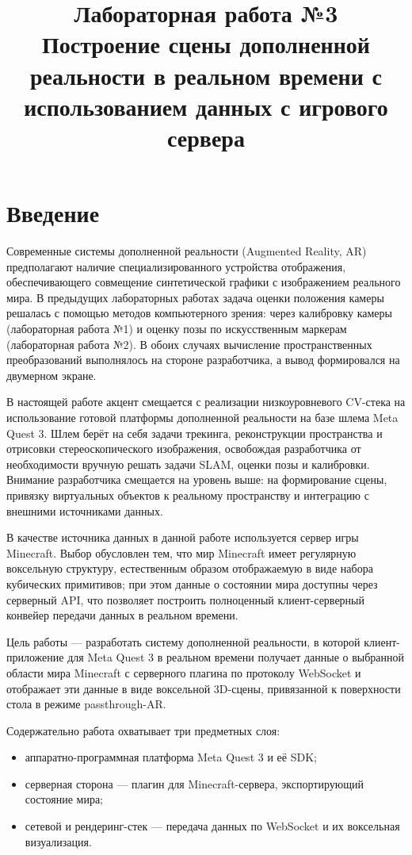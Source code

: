 \documentclass[a4paper,12pt]{article}
\title{Лабораторная работа №3 \\
Построение сцены дополненной реальности в реальном времени с использованием данных с игрового сервера}
\author{}
\date{}
\begin{document}
\maketitle


\section*{Введение}

Современные системы дополненной реальности (Augmented Reality, AR) предполагают наличие специализированного устройства отображения, обеспечивающего совмещение синтетической графики с изображением реального мира. В предыдущих лабораторных работах задача оценки положения камеры решалась с помощью методов компьютерного зрения: через калибровку камеры (лабораторная работа №1) и оценку позы по искусственным маркерам (лабораторная работа №2). В обоих случаях вычисление пространственных преобразований выполнялось на стороне разработчика, а вывод формировался на двумерном экране.

В настоящей работе акцент смещается с реализации низкоуровневого CV-стека на использование готовой платформы дополненной реальности на базе шлема Meta Quest 3. Шлем берёт на себя задачи трекинга, реконструкции пространства и отрисовки стереоскопического изображения, освобождая разработчика от необходимости вручную решать задачи SLAM, оценки позы и калибровки. Внимание разработчика смещается на уровень выше: на формирование сцены, привязку виртуальных объектов к реальному пространству и интеграцию с внешними источниками данных.

В качестве источника данных в данной работе используется сервер игры Minecraft. Выбор обусловлен тем, что мир Minecraft имеет регулярную воксельную структуру, естественным образом отображаемую в виде набора кубических примитивов; при этом данные о состоянии мира доступны через серверный API, что позволяет построить полноценный клиент-серверный конвейер передачи данных в реальном времени.

Цель работы --- разработать систему дополненной реальности, в которой клиент-приложение для Meta Quest 3 в реальном времени получает данные о выбранной области мира Minecraft с серверного плагина по протоколу WebSocket и отображает эти данные в виде воксельной 3D-сцены, привязанной к поверхности стола в режиме passthrough-AR.

Содержательно работа охватывает три предметных слоя:

\begin{itemize}
    \item аппаратно-программная платформа Meta Quest 3 и её SDK;
    \item серверная сторона --- плагин для Minecraft-сервера, экспортирующий состояние мира;
    \item сетевой и рендеринг-стек --- передача данных по WebSocket и их воксельная визуализация.
\end{itemize}
\end{document}
